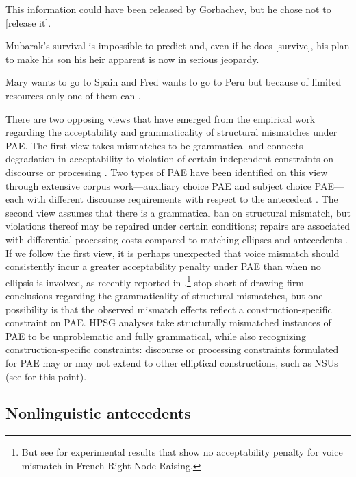 {\eal

\ex This information could have been released by Gorbachev, but he chose not to [release it]. \citep[37]{Hardt1993} \label{27}

\ex Mubarak's survival is impossible to predict and, even if he does [survive], his plan to make his son his heir apparent is now in serious jeopardy. \citep[7]{Miller2014a} \label{28}

\ex Mary wants to go to Spain and Fred wants to go to Peru but because of limited resources only one of them can . \citep[128]{Webber79a} \label{29}
\zl

There are two opposing views that have emerged from the empirical work regarding the acceptability and grammaticality of structural mismatches under PAE. The first view takes mismatches to be grammatical and connects degradation in acceptability to violation of certain independent constraints on discourse \citep{Kehler2002, Miller2011, %
Miller2014, Miller2014a, Miller2014b} or processing \citep{Kim2011}. Two types of PAE have been identified on this view through extensive corpus work---auxiliary choice PAE and subject choice PAE---each with different discourse requirements with respect to the antecedent \citep{Miller2011, Miller2014a, Miller2014b}. The second view assumes that there is a grammatical ban on structural mismatch, but violations thereof may be repaired under certain conditions; repairs are associated with differential processing costs compared to matching ellipses and antecedents \citep{Arregui2006, Grant2012}. If we follow the first view, it is perhaps unexpected that voice mismatch should consistently incur a greater acceptability penalty under PAE than when no ellipsis is involved, as recently reported in \citet{Kim2018}.\footnote{But see \citet{Abeille2016} for experimental results
that show no acceptability penalty for voice mismatch in French Right Node Raising.} \citet{Kim2018} stop short of drawing firm conclusions regarding the grammaticality of structural mismatches, but one possibility is that the observed mismatch effects reflect a construction-specific constraint on PAE. HPSG analyses take structurally mismatched instances of PAE to be unproblematic and fully grammatical, while also recognizing construction-specific constraints: discourse or processing constraints formulated for PAE may or may not extend to other elliptical constructions, such as NSUs (see \citealt{Abeille2016,Ginzburg2018} for this point).


\subsection{Nonlinguistic antecedents}
\label{sec-nonlinguistic-antecedents}

}
